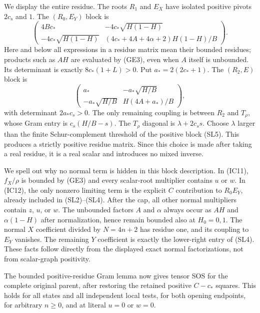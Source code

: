 We display the entire residue. The roots $R_1$ and $E_X$ have isolated
positive pivots $2c_s$ and $1$. The $(R_0,E_Y)$ block is
\[
 \begin{pmatrix}
 4Bc_*&-4c_*\sqrt{H(1-H)}\\
 -4c_*\sqrt{H(1-H)}&
 (4c_*+4A+4\alpha+2)H(1-H)/B
 \end{pmatrix}.
\tag{SL4}
\]
Here and below all expressions in a residue matrix mean their bounded
residues; products such as $AH$ are evaluated by (GE3), even when
$A$ itself is unbounded. Its determinant is exactly $8c_*(1+L)>0$.
Put $a_*=2(2c_*+1)$. The $(R_2,E)$ block is
\[
 \begin{pmatrix}
 a_*&-a_*\sqrt{H/B}\\
 -a_*\sqrt{H/B}&H(4A+a_*)/B
 \end{pmatrix},
\tag{SL5}
\]
with determinant $2a_*c_s>0$. The only remaining coupling is between
$R_2$ and $T_\rho$, whose Gram entry is
$c_s(H/B-s)$. The $T_\rho$ diagonal is $\lambda+2c_s s$.
Choose $\lambda$ larger than the finite Schur-complement threshold
of the positive block (SL5). This produces a strictly positive
residue matrix. Since this choice is made after taking a real
residue, it is a real scalar and introduces no mixed inverse.

We spell out why no normal term is hidden in this block description.
In (IC11), $f_X/\rho$ is bounded by (GE3) and every scalar-root
multiplier contains $u$ or $w$. In (IC12), the only nonzero limiting
term is the explicit $C$ contribution to $R_0E_Y$, already included
in (SL2)--(SL4). After the cap, all other normal multipliers contain
$z$, $u$, or $w$. The unbounded factors $A$ and $\alpha$ always occur
as $AH$ and $\alpha(1-H)$ after normalization, hence remain bounded
also at $H_0=0,1$. The normal $X$ coefficient divided by $N=4n+2$
has residue one, and its coupling to $E_Y$ vanishes. The remaining
$Y$ coefficient is exactly the lower-right entry of (SL4).
These facts follow directly from the displayed exact normal
factorizations, not from scalar-graph positivity.

The bounded positive-residue Gram lemma now gives tensor SOS for the
complete original parent, after restoring the retained positive
$C-c_*$ squares. This holds for all states and all independent local
tests, for both opening endpoints, for arbitrary $n\ge0$, and at
literal $u=0$ or $w=0$.
